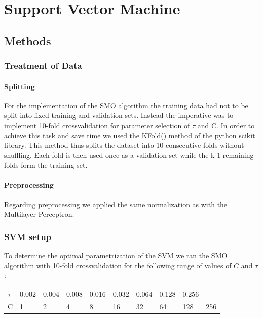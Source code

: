 \section{Support Vector Machine}

\subsection{Methods}
\subsubsection{Treatment of Data}
\paragraph{Splitting}
For the implementation of the SMO algorithm the training data had not to be split into fixed training and validation sets. Instead the imperative was to implement 10-fold crossvalidation for parameter selection of $\tau$ and C. In order to achieve this task and save time we used the KFold() method of the python scikit library. This method thus splits the dataset into 10 consecutive folds without shuffling. Each fold is then used once as a validation set while the k-1 remaining folds form the training set.
\paragraph{Preprocessing}
Regarding preprocessing we applied the same normalization as with the Multilayer Perceptron.

\subsubsection{SVM setup}
To determine the optimal parametrization of the SVM we ran the SMO algorithm with 10-fold crossvalidation for the following range of values of $C$ and $\tau$:
\begin{center}
\begin{tabular}{l|lllllllll} 
	\toprule
	$\tau$ & 0.002 & 0.004 & 0.008 & 0.016 & 0.032 & 0.064 & 0.128 & 0.256 \\
	C & 1 & 2 & 4 & 8 & 16 & 32 & 64 & 128 & 256 \\
	\bottomrule
\end{tabular}
\end{center}

